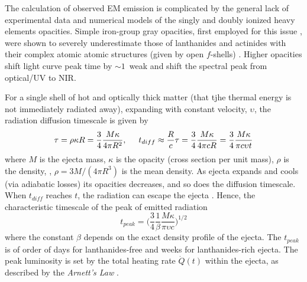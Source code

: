 The calculation of observed \ac{EM} emission is complicated by the %
general lack of experimental data and numerical models of the singly 
and doubly ionized heavy \rproc{} elements opacities. 
Simple iron-group gray opacities, first employed for this issue \citep{Roberts:2011}, 
were shown to severely underestimate those of lanthanides and actinides with their 
complex atomic atomic structures (given by open $f$-shells) 
\citep{Kasen:2013xka,Tanaka:2013ana}. 
%
Higher opacities shift light curve peak time by ${\sim}1$~weak \citep{Barnes:2013wka} 
and shift the spectral peak from optical/\ac{UV} to \ac{NIR}.


For a single shell of hot and optically thick matter 
(that tjhe thermal energy is not immediately radiated away), 
expanding with constant velocity, $\upsilon$, 
the radiation diffusion timescale is given by 
%
\begin{equation}
\tau = \rho \kappa R = \frac{3}{4}\frac{M\kappa}{4\pi R^2}, \hspace{5mm} 
t_{diff} \approx \frac{R}{c}\tau = \frac{3}{4}\frac{M\kappa}{4\pi c R} = \frac{3}{4}\frac{M\kappa}{\pi c \upsilon t}
\end{equation}
%
where $M$ is the ejecta mass, $\kappa$ is the opacity (cross section per unit mass), 
$\rho$ is the density, \eg, $\rho=3M/(4\pi R^3)$ is the mean density.
%
As ejecta expands and cools (via adiabatic losses) its opacities decreases, 
and so does the diffusion timescale. 
When $t_{diff}$ reaches $t$, the radiation can escape the ejecta \citep{Arnett:1982}. 
Hence, the characteristic timescale of the peak of emitted radiation 
%
\begin{equation}
t_{peak} = \Big(\frac{3}{4}\frac{1}{\beta}\frac{M\kappa}{\pi \upsilon c}\Big)^{1/2}
\end{equation}
%
where the constant $\beta$ depends on the exact density profile of the ejecta. 
The $t_{peak}$ is of order of days for lanthanides-free and weeks for lanthanides-rich ejecta.
The peak luminosity is set by the total heating rate $\dot{Q}(t)$ within the ejecta, 
as described by the \textit{Arnett's Law} \citep{Arnett:1982}. 

